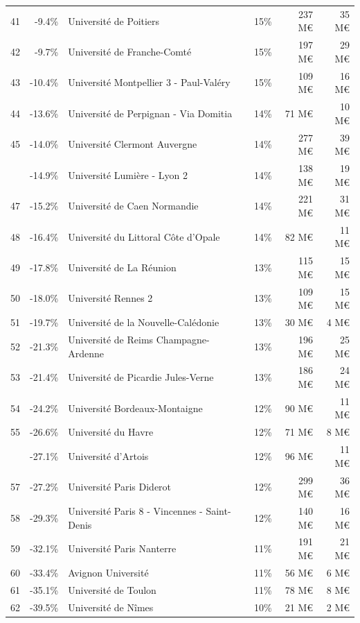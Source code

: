\documentclass[12pt,french,]{article}
\begin{document}
\begin{longtable}{rrlrrr}
\addlinespace
\rowcolor{gray!6}  41 & -9.4\% & Université de Poitiers & 15\% & 237 M€ & 35 M€\\
42 & -9.7\% & Université de Franche-Comté & 15\% & 197 M€ & 29 M€\\
\rowcolor{gray!6}  43 & -10.4\% & Université Montpellier 3 - Paul-Valéry & 15\% & 109 M€ & 16 M€\\
44 & -13.6\% & Université de Perpignan - Via Domitia & 14\% & 71 M€ & 10 M€\\
\rowcolor{gray!6}  45 & -14.0\% & Université Clermont Auvergne & 14\% & 277 M€ & 39 M€\\
\addlinespace
46 & -14.9\% & Université Lumière - Lyon 2 & 14\% & 138 M€ & 19 M€\\
\rowcolor{gray!6}  47 & -15.2\% & Université de Caen Normandie & 14\% & 221 M€ & 31 M€\\
48 & -16.4\% & Université du Littoral Côte d'Opale & 14\% & 82 M€ & 11 M€\\
\rowcolor{gray!6}  49 & -17.8\% & Université de La Réunion & 13\% & 115 M€ & 15 M€\\
50 & -18.0\% & Université Rennes 2 & 13\% & 109 M€ & 15 M€\\
\addlinespace
\rowcolor{gray!6}  51 & -19.7\% & Université de la Nouvelle-Calédonie & 13\% & 30 M€ & 4 M€\\
52 & -21.3\% & Université de Reims Champagne-Ardenne & 13\% & 196 M€ & 25 M€\\
\rowcolor{gray!6}  53 & -21.4\% & Université de Picardie Jules-Verne & 13\% & 186 M€ & 24 M€\\
54 & -24.2\% & Université Bordeaux-Montaigne & 12\% & 90 M€ & 11 M€\\
\rowcolor{gray!6}  55 & -26.6\% & Université du Havre & 12\% & 71 M€ & 8 M€\\
\addlinespace
56 & -27.1\% & Université d'Artois & 12\% & 96 M€ & 11 M€\\
\rowcolor{gray!6}  57 & -27.2\% & Université Paris Diderot & 12\% & 299 M€ & 36 M€\\
58 & -29.3\% & Université Paris 8 - Vincennes - Saint-Denis & 12\% & 140 M€ & 16 M€\\
\rowcolor{gray!6}  59 & -32.1\% & Université Paris Nanterre & 11\% & 191 M€ & 21 M€\\
60 & -33.4\% & Avignon Université & 11\% & 56 M€ & 6 M€\\
\addlinespace
\rowcolor{gray!6}  61 & -35.1\% & Université de Toulon & 11\% & 78 M€ & 8 M€\\
62 & -39.5\% & Université de Nîmes & 10\% & 21 M€ & 2 M€\\

\end{longtable}
\end{document}
